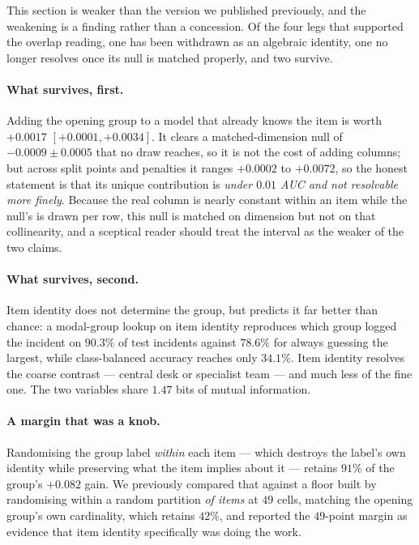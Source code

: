 \documentclass[preprint,12pt]{elsarticle}
\begin{document}
This section is weaker than the version we published previously, and the
weakening is a finding rather than a concession. Of the four legs that
supported the overlap reading, one has been withdrawn as an algebraic
identity, one no longer resolves once its null is matched properly, and two
survive.

\paragraph{What survives, first.}
Adding the opening group to a model that already knows the
item is worth $+0.0017$ $[+0.0001,+0.0034]$. It clears a matched-dimension
null of $-0.0009 \pm 0.0005$ that no draw reaches, so it is not the cost of
adding columns; but across split points and penalties it ranges $+0.0002$ to
$+0.0072$, so the honest statement is that its unique contribution is
\emph{under $0.01$ AUC and not resolvable more finely}. Because the real
column is nearly constant within an item while the null's is drawn per row,
this null is matched on dimension but not on that collinearity, and a
sceptical reader should treat the interval as the weaker of the two claims.

\paragraph{What survives, second.}
Item identity does not determine the group, but predicts it far better than
chance: a modal-group lookup on item identity reproduces which group logged
the incident on $90.3\%$ of test incidents against $78.6\%$ for always
guessing the largest, while class-balanced accuracy reaches only $34.1\%$.
Item identity resolves the coarse contrast --- central desk or specialist
team --- and much less of the fine one. The two variables share
$1.47$ bits of mutual information.

\paragraph{A margin that was a knob.}
Randomising the group label \emph{within} each item --- which destroys the
label's own identity while preserving what the item implies about it ---
retains $91\%$ of the group's $+0.082$ gain. We previously compared that
against a floor built by randomising within a random partition \emph{of
items} at $49$ cells, matching the opening group's own cardinality, which
retains $42\%$, and reported the $49$-point margin as evidence that item
identity specifically was doing the work.
\end{document}
